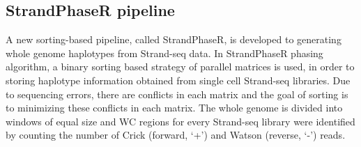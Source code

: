 \subsection{StrandPhaseR pipeline}
	A new sorting-based pipeline, called StrandPhaseR, is developed to generating whole genome haplotypes from Strand-seq data.
	In StrandPhaseR phasing algorithm, a binary sorting based strategy of parallel matrices is used, in order to storing haplotype information obtained from single cell Strand-seq libraries. 
	Due to sequencing errors, there are conflicts in each matrix and the goal of sorting is to minimizing these conflicts in each matrix.
        The whole genome is divided into windows of equal size and WC regions for every Strand-seq library were identified by counting the number of Crick (forward, ‘+’) and Watson (reverse, ‘-’) reads.
 
	
